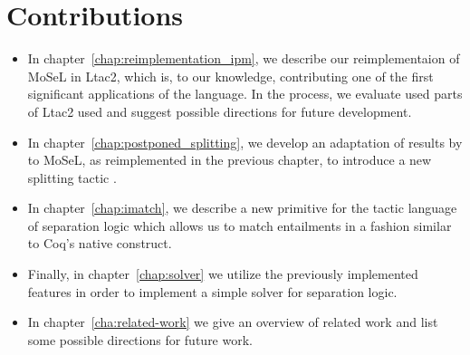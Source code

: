 \section{Contributions}
\label{sec:contributions}

\begin{itemize}
\item In chapter~\ref{chap:reimplementation_ipm}, we describe our reimplementaion of MoSeL in Ltac2, which is, to our knowledge, contributing one of the first significant applications of the language.
  In the process, we evaluate used parts of Ltac2 used and suggest possible directions for future development.
\item In chapter~\ref{chap:postponed_splitting}, we develop an adaptation of results by \citet{harlandResourceDistributionBooleanConstraints2003} to MoSeL, as reimplemented in the previous chapter, to introduce a new splitting tactic .
\item In chapter~\ref{chap:imatch}, we describe a new primitive  for the tactic language of separation logic which allows us to match entailments in a fashion similar to Coq's native  construct.
\item Finally, in chapter~\ref{chap:solver} we utilize the previously implemented features in order to implement a simple solver for separation logic.
\item In chapter~\ref{cha:related-work} we give an overview of related work and list some possible directions for future work.
\end{itemize}


